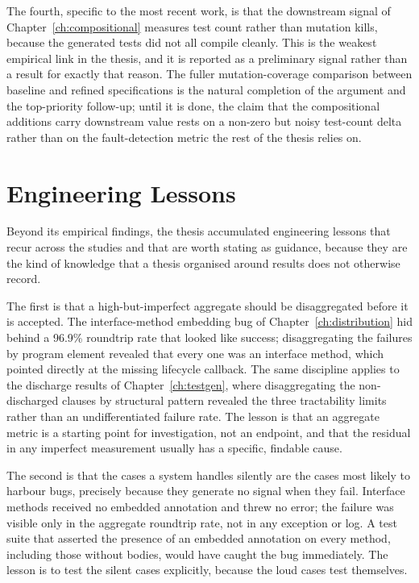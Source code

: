 The fourth, specific to the most recent work, is that the downstream signal of
Chapter~\ref{ch:compositional} measures test count rather than mutation kills,
because the generated tests did not all compile cleanly. This is the weakest
empirical link in the thesis, and it is reported as a preliminary signal rather
than a result for exactly that reason. The fuller mutation-coverage comparison
between baseline and refined specifications is the natural completion of the
argument and the top-priority follow-up; until it is done, the claim that the
compositional additions carry downstream value rests on a non-zero but noisy
test-count delta rather than on the fault-detection metric the rest of the thesis
relies on.

\section{Engineering Lessons}
\label{sec:syn-engineering}

Beyond its empirical findings, the thesis accumulated engineering lessons that
recur across the studies and that are worth stating as guidance, because they are
the kind of knowledge that a thesis organised around results does not otherwise
record.

The first is that a high-but-imperfect aggregate should be disaggregated before it
is accepted. The interface-method embedding bug of Chapter~\ref{ch:distribution}
hid behind a 96.9\% roundtrip rate that looked like success; disaggregating the
failures by program element revealed that every one was an interface method, which
pointed directly at the missing lifecycle callback. The same discipline applies to
the discharge results of Chapter~\ref{ch:testgen}, where disaggregating the
non-discharged clauses by structural pattern revealed the three tractability limits
rather than an undifferentiated failure rate. The lesson is that an aggregate
metric is a starting point for investigation, not an endpoint, and that the
residual in any imperfect measurement usually has a specific, findable cause.

The second is that the cases a system handles silently are the cases most likely to
harbour bugs, precisely because they generate no signal when they fail. Interface
methods received no embedded annotation and threw no error; the failure was visible
only in the aggregate roundtrip rate, not in any exception or log. A test suite that
asserted the presence of an embedded annotation on every method, including those
without bodies, would have caught the bug immediately. The lesson is to test the
silent cases explicitly, because the loud cases test themselves.

